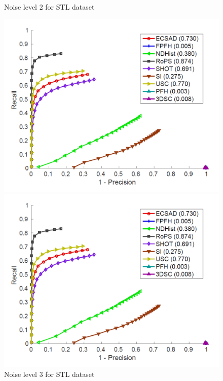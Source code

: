 \documentclass[10pt,twocolumn,letterpaper]{article}
\begin{document}
\begin{figure}[htp]
\begin{minipage}[b]{.3\textwidth}
\caption{Noise level 2 for STL dataset}\label{fig:stl_n2}
\end{minipage}
\begin{minipage}[b]{.3\textwidth}
\includegraphics[width=1.0\linewidth, height= 1.0\linewidth, keepaspectratio]{img/PRC_1.pdf}
\caption{Noise level 3 for STL dataset}\label{fig:stl_n3}
\end{minipage}
\begin{minipage}[b]{.3\textwidth}
\includegraphics[width=1.0\linewidth, height= 1.0\linewidth, keepaspectratio]{img/PRC_1.pdf} 

\end{minipage}
\end{figure}
\end{document}
